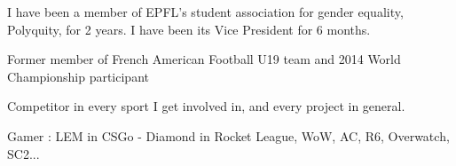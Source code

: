


\begin{cventries}


\cventry
{} %
{}
{}
{}
{ %
\begin{cvitems}
\item {I have been a member of EPFL's student association for gender equality, Polyquity, for 2 years. I have been its Vice President for 6 months.}
\item {Former member of French American Football U19 team and 2014 World Championship participant}
\item {Competitor in every sport I get involved in, and every project in general.}
\item {Gamer : LEM in CSGo - Diamond in Rocket League, WoW, AC, R6, Overwatch, SC2...}
\end{cvitems}
}




\end{cventries}